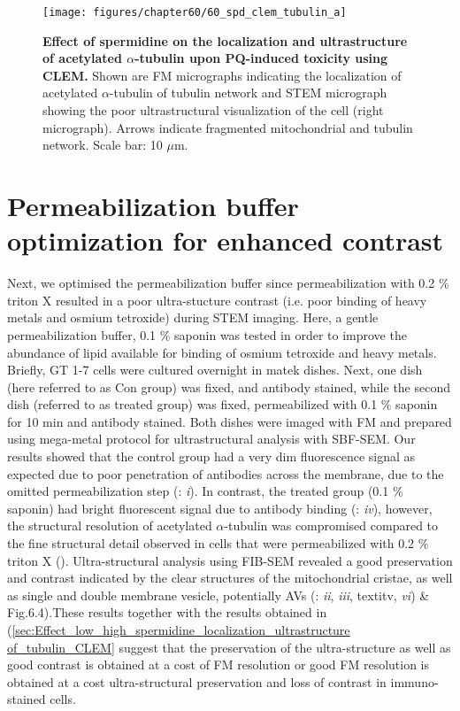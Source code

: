\begin{landscape}
\begin{figure}[!htbp]
\centering
  \texttt{[image: figures/chapter60/60\_spd\_clem\_tubulin\_a]}
  \caption[Effect of spermidine on the localization and ultrastructure of acetylated $\alpha$-tubulin upon PQ-induced toxicity using CLEM]{\textbf{Effect of spermidine on the localization and ultrastructure of acetylated $\alpha$-tubulin upon PQ-induced toxicity using CLEM.} Shown are FM micrographs indicating the localization of acetylated $\alpha$-tubulin of tubulin network and STEM micrograph showing the poor ultrastructural visualization of the cell (right micrograph). Arrows indicate fragmented mitochondrial and tubulin network. Scale bar: 10 $\mu$m.}
  \label{fig:60_spd_clem_tubulin_a}
\end{figure} 
\end{landscape}

\section{Permeabilization buffer optimization for enhanced contrast}
Next, we optimised the permeabilization buffer since permeabilization with 0.2 \% triton X resulted in a poor ultra-stucture contrast (i.e. poor binding of heavy metals and osmium tetroxide) during STEM imaging. Here, a gentle permeabilization buffer, 0.1 \% saponin was tested in order to improve the abundance of lipid available for binding of osmium tetroxide and heavy metals. Briefly, GT 1-7 cells were cultured overnight in matek dishes. Next, one dish (here referred to as Con group) was fixed, and antibody stained, while the second dish (referred to as  treated group) was fixed, permeabilized with 0.1 \% saponin for 10 min and antibody stained. Both dishes were imaged with FM and prepared using mega-metal protocol for ultrastructural analysis with SBF-SEM. Our results showed that the control group had a very dim fluorescence signal as expected due to poor penetration of antibodies across the membrane, due to the omitted permeabilization step (: \textit{i}). In contrast, the treated group (0.1 \% saponin) had bright fluorescent signal due to antibody binding (: \textit{iv}), however, the structural resolution of acetylated $\alpha$-tubulin was compromised compared to the fine structural detail observed in cells that were permeabilized with 0.2 \% triton X (). Ultra-structural analysis using FIB-SEM revealed a good preservation and contrast indicated by the clear structures of the mitochondrial cristae, as well as single and double membrane vesicle, potentially AVs (: \textit{ii}, \textit{iii}, textit{v}, \textit{vi}) \& Fig.6.4).These results together with the results obtained in (\cref{sec:Effect_low_high_spermidine_localization_ultrastructure of_tubulin_CLEM} suggest that the preservation of the ultra-structure as well as good contrast is obtained at a cost of FM resolution or good FM resolution is obtained at a cost ultra-structural preservation and loss of contrast in immuno-stained cells.

